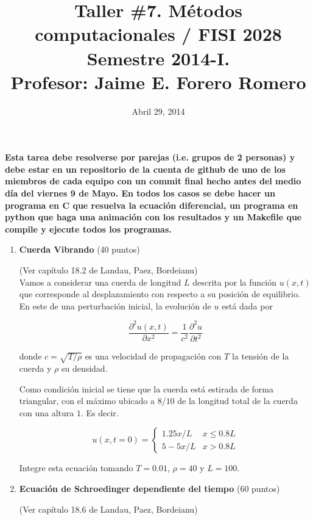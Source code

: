\documentclass{article}
\title{Taller \#7. M\'etodos computacionales / FISI 2028 \\Semestre
  2014-I. \\ Profesor: Jaime E. Forero Romero}
\date{Abril 29, 2014}
\begin{document}
\maketitle

{\bf Esta tarea debe resolverse por parejas (i.e. grupos de 2
  personas) y debe estar en un repositorio de la cuenta de github de
  uno de los miembros de cada equipo con un commit final hecho antes del
  medio d\'ia del viernes 9 de Mayo. En todos los casos se debe hacer
  un programa en C que resuelva la ecuaci\'on diferencial, un programa
en python que haga una animaci\'on con los resultados y un Makefile
que compile y ejecute todos los programas.}

\begin{enumerate}

\item {\bf Cuerda Vibrando} (40 puntos)

(Ver cap\'itulo 18.2 de Landau, Paez, Bordeianu)\\

Vamos a considerar una cuerda de longitud $L$ descrita por la funci\'on
$u(x,t)$ que corresponde al desplazamiento con respecto a su
posici\'on de equilibrio. En este de una perturbaci\'on inicial, la
evoluci\'on de $u$ est\'a dada por 

\begin{equation}
\frac{\partial^2 u (x,t)}{\partial x^2} =
\frac{1}{c^2}\frac{\partial^2 u}{\partial t^2}
\end{equation}

donde $c=\sqrt{T/\rho}$ es una velocidad de propagaci\'on con $T$ la
tensi\'on de la cuerda y $\rho$ su densidad.

Como condici\'on inicial se tiene que la cuerda est\'a estirada de
forma triangular, con el m\'aximo ubicado a $8/10$ de la longitud
total de la cuerda con una altura $1$. Es decir.

\begin{equation}
u(x,t=0) = 
\begin{cases}
1.25x/L & x\leq 0.8L\\
5-5x/L & x>0.8L
\end{cases}
\end{equation}

Integre esta ecuaci\'on tomando $T=0.01$, $\rho=40$ y $L=100$. 

\item {\bf Ecuaci\'on de Schroedinger dependiente del tiempo} (60 puntos)

(Ver cap\'itulo 18.6 de Landau, Paez, Bordeianu)\\


\end{enumerate}
\end{document}
